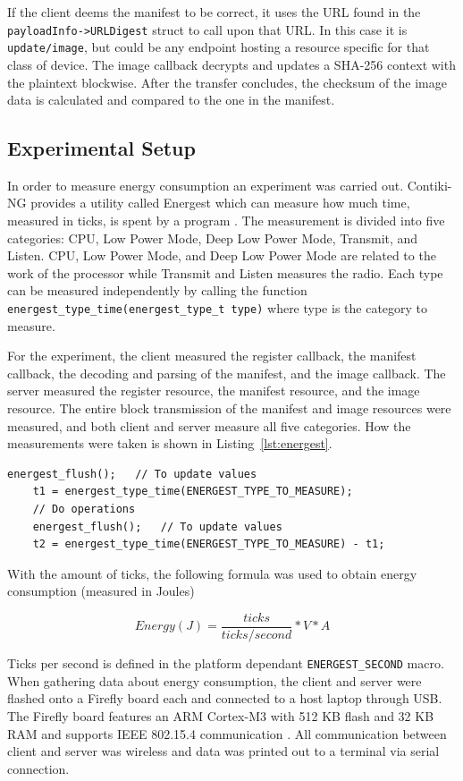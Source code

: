 \documentclass[0-thesis.tex]{subfiles}
\begin{document}
If the client deems the manifest to be correct, it uses the URL found in the
\texttt{payloadInfo->URLDigest} struct to call upon that URL. In this case it is
\texttt{update/image}, but could be any endpoint hosting a resource specific for that
class of device. The image callback decrypts and updates a SHA-256 context with the
plaintext blockwise. After the transfer concludes, the checksum of the image data is
calculated and compared to the one in the manifest.

\subsection{Experimental Setup}
\label{ssec:experimental-setup}
In order to measure energy consumption an experiment was carried out. Contiki-NG provides
a utility called Energest which can measure how much time, measured in ticks, is spent by
a program \parencite{energest}. The measurement is divided into five categories: CPU, Low
Power Mode, Deep Low Power Mode, Transmit, and Listen. CPU, Low Power Mode, and Deep Low
Power Mode are related to the work of the processor while Transmit and Listen measures the
radio. Each type can be measured independently by calling the function
\texttt{energest\_type\_time(energest\_type\_t type)} where type is the category to
measure. 

For the experiment, the client measured the register callback, the manifest callback, the
decoding and parsing of the manifest, and the image callback. The server measured the
register resource, the manifest resource, and the image resource. The entire block
transmission of the manifest and image resources were measured, and both client and server
measure all five categories. How the measurements were taken is shown in
Listing~\ref{lst:energest}.

\begin{lstlisting}[language=manifest, caption={How to measure ticks in energest.}, label=lst:energest]
    energest_flush();   // To update values
    t1 = energest_type_time(ENERGEST_TYPE_TO_MEASURE);
    // Do operations
    energest_flush();   // To update values
    t2 = energest_type_time(ENERGEST_TYPE_TO_MEASURE) - t1;
\end{lstlisting}

With the amount of ticks, the following formula was used to obtain energy consumption
(measured in Joules)

$$ Energy (J) = \frac{ticks}{ticks/second} * V * A $$

Ticks per second is defined in the platform dependant \texttt{ENERGEST\_SECOND} macro.
When gathering data about energy consumption, the client and server were flashed onto a
Firefly board each and connected to a host laptop through USB. The Firefly board features
an ARM Cortex-M3 with 512 KB flash and 32 KB RAM and supports IEEE 802.15.4 communication
\parencite{firefly-datasheet}. All communication between client and server was wireless
and data was printed out to a terminal via serial connection. 
\end{document}
